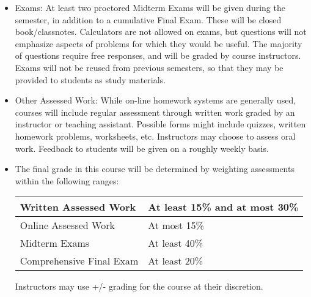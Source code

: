 \documentclass[12 pt]{article}
\begin{document}
	\begin{itemize}
		\item[] Exams: At least two proctored Midterm Exams will be given during the semester, in addition to a cumulative Final Exam. These will be closed book/classnotes. Calculators are not allowed on exams, but questions will not emphasize aspects of problems for which they would be useful. The majority of questions require free responses, and will be graded by course instructors.  Exams will not be reused from previous semesters,  so that they may be provided to students as study materials.
		 
		 
\item[] Other Assessed Work: While on-line homework systems are generally used, courses will include regular assessment through written work graded by an instructor or teaching assistant. Possible forms might include quizzes, written homework problems, worksheets, etc. Instructors may choose to assess oral work. Feedback to students will be given on a roughly weekly basis.



	\item[] The final grade in this course will be determined by weighting assessments within the following ranges:
	
	\begin{center}\begin{tabular}{l|l}
			
			Written Assessed Work & At least 15\% and at most 30\%\\

			\hline
			Online Assessed Work & At most 15\%\\
			\hline
			Midterm Exams & At least 40\% \\
			\hline
			Comprehensive Final Exam & At least 20\%\\
			
			
		\end{tabular}\end{center}
		Instructors may use +/- grading for the course at their discretion.
	\end{itemize}
	
	
\end{document}
